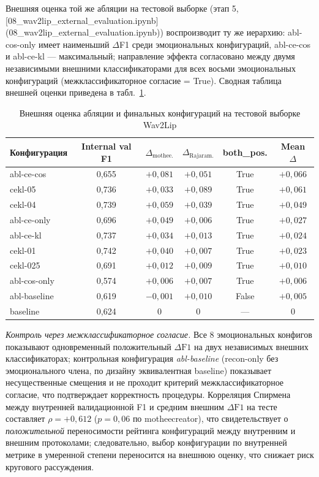 \documentclass[a4paper, 12pt, oneside, openany]{article}
\begin{document}
Внешняя оценка той же абляции на тестовой выборке (этап 5, [08\_wav2lip\_external\_evaluation.ipynb](08\_wav2lip\_external\_evaluation.ipynb)) воспроизводит ту же иерархию: abl-cos-only имеет наименьший $\Delta$F1 среди эмоциональных конфигураций, abl-ce-cos и abl-ce-kl --- максимальный; направление эффекта согласовано между двумя независимыми внешними классификаторами для всех восьми эмоциональных конфигураций (межклассификаторное согласие = True). Сводная таблица внешней оценки приведена в табл.~\ref{tab:abl_external}.

\begin{table}[H]
\caption{Внешняя оценка абляции и финальных конфигураций на тестовой выборке Wav2Lip}
\label{tab:abl_external}
\centering
\small
\begin{tabular}{|p{2.5cm}|c|c|c|c|c|}
\hline
\textbf{Конфигурация} & \textbf{Internal val F1} & $\Delta_{\text{mothee.}}$ & $\Delta_{\text{Rajaram.}}$ & \textbf{both\_pos.} & \textbf{Mean $\Delta$} \\
\hline
abl-ce-cos & 0,655 & $+0{,}081$ & $+0{,}051$ & True & $+0{,}066$ \\
\hline
cekl-05 & 0,736 & $+0{,}033$ & $+0{,}089$ & True & $+0{,}061$ \\
\hline
cekl-04 & 0,739 & $+0{,}059$ & $+0{,}039$ & True & $+0{,}049$ \\
\hline
abl-ce-only & 0,696 & $+0{,}049$ & $+0{,}006$ & True & $+0{,}027$ \\
\hline
abl-ce-kl & 0,737 & $+0{,}034$ & $+0{,}013$ & True & $+0{,}024$ \\
\hline
cekl-01 & 0,742 & $+0{,}040$ & $+0{,}007$ & True & $+0{,}023$ \\
\hline
cekl-025 & 0,691 & $+0{,}012$ & $+0{,}009$ & True & $+0{,}010$ \\
\hline
abl-cos-only & 0,574 & $+0{,}006$ & $+0{,}007$ & True & $+0{,}006$ \\
\hline
abl-baseline & 0,619 & $-0{,}001$ & $+0{,}010$ & False & $+0{,}005$ \\
\hline
baseline & 0,624 & 0 & 0 & --- & 0 \\
\hline
\end{tabular}
\end{table}

\textit{Контроль через межклассификаторное согласие.} Все 8 эмоциональных конфигов показывают одновременный положительный $\Delta\text{F1}$ на двух независимых внешних классификаторах; контрольная конфигурация \textit{abl-baseline} (recon-only без эмоционального члена, по дизайну эквивалентная baseline) показывает несущественные смещения и не проходит критерий межклассификаторное согласие, что подтверждает корректность процедуры. Корреляция Спирмена между внутренней валидационной F1 и средним внешним $\Delta\text{F1}$ на тесте составляет $\rho = +0{,}612$ ($p = 0{,}06$ по motheecreator), что свидетельствует о \textit{положительной} переносимости рейтинга конфигураций между внутренним и внешним протоколами; следовательно, выбор конфигурации по внутренней метрике в умеренной степени переносится на внешнюю оценку, что снижает риск кругового рассуждения.
\end{document}
